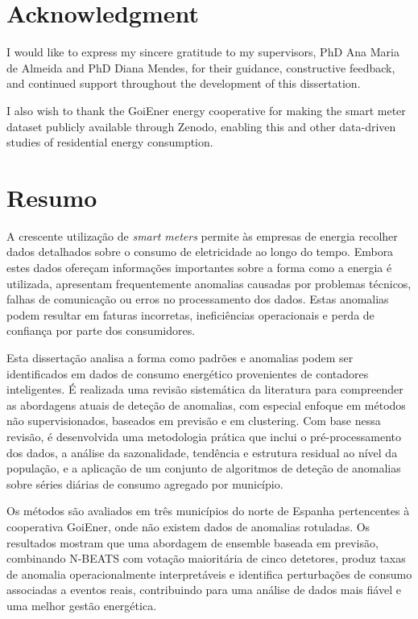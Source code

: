 ﻿\documentclass[12pt,reqno, twoside]{amsbook}
\numberwithin{figure}{chapter}
\numberwithin{table}{chapter}
\numberwithin{equation}{chapter}
\theoremstyle{plain}
\numberwithin{equation}{chapter}
\numberwithin{section}{chapter}
\begin{document}
\setcounter{page}{1}
\chapter*{Acknowledgment}

I would like to express my sincere gratitude to my supervisors, PhD Ana Maria de Almeida and PhD Diana Mendes, for their guidance, constructive feedback, and continued support throughout the development of this dissertation.

I also wish to thank the GoiEner energy cooperative for making the smart meter dataset publicly available through Zenodo, enabling this and other data-driven studies of residential energy consumption.

\chapter*{Resumo}
A crescente utilização de \textit{smart meters} permite às empresas de energia recolher dados detalhados sobre o consumo de eletricidade ao longo do tempo. Embora estes dados ofereçam informações importantes sobre a forma como a energia é utilizada, apresentam frequentemente anomalias causadas por problemas técnicos, falhas de comunicação ou erros no processamento dos dados. Estas anomalias podem resultar em faturas incorretas, ineficiências operacionais e perda de confiança por parte dos consumidores.

Esta dissertação analisa a forma como padrões e anomalias podem ser identificados em dados de consumo energético provenientes de contadores inteligentes. É realizada uma revisão sistemática da literatura para compreender as abordagens atuais de deteção de anomalias, com especial enfoque em métodos não supervisionados, baseados em previsão e em clustering. Com base nessa revisão, é desenvolvida uma metodologia prática que inclui o pré-processamento dos dados, a análise da sazonalidade, tendência e estrutura residual ao nível da população, e a aplicação de um conjunto de algoritmos de deteção de anomalias sobre séries diárias de consumo agregado por município.

Os métodos são avaliados em três municípios do norte de Espanha pertencentes à cooperativa GoiEner, onde não existem dados de anomalias rotuladas. Os resultados mostram que uma abordagem de ensemble baseada em previsão, combinando N-BEATS com votação maioritária de cinco detetores, produz taxas de anomalia operacionalmente interpretáveis e identifica perturbações de consumo associadas a eventos reais, contribuindo para uma análise de dados mais fiável e uma melhor gestão energética.
\end{document}
